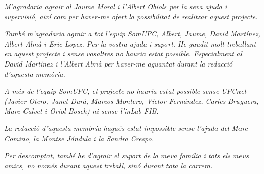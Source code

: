 %


    
\begin{minipage}[c][\textheight][c]{\textwidth}%
    \begin{center}

\textit{M'agradaria agrair al Jaume Moral i l'Albert Obiols per la seva ajuda i supervisió, així com per haver-me ofert la possibilitat de realitzar aquest projecte.}

\textit{També m'agradaria agrair a tot l'equip SomUPC, Albert, Jaume, David Martínez, Albert Almà i Eric Lopez. Per la vostra ajuda i suport. He gaudit molt treballant en aquest projecte i sense vosaltres no hauria estat possible. Especialment al David Martínez i l'Albert Almà per haver-me aguantat durant la redacció d'aquesta memòria.}

\textit{A més de l'equip SomUPC, el projecte no hauria estat possible sense UPCnet (Javier Otero, Janet Durà, Marcos Montero, Víctor Fernández, Carles Bruguera, Marc Calvet i Oriol Bosch) ni sense l'inLab FIB.}

\textit{La redacció d'aquesta memòria hagués estat impossible sense l'ajuda del Marc Comino, la Montse Jándula i la Sandra Crespo.}

\textit{Per descomptat, també he d'agrair el suport de la meva família i tots els meus amics, no només durant aquest treball, sinó durant tota la carrera.}

    \end{center}
\end{minipage}%


